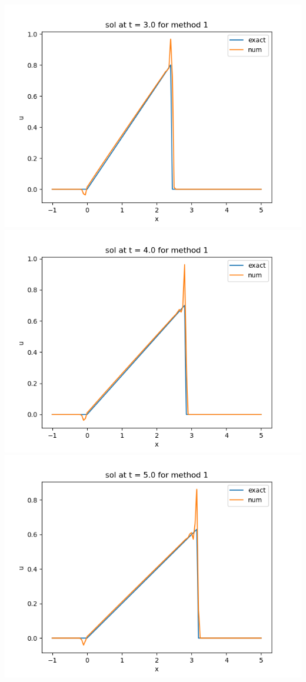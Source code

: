 \documentclass{article}
\begin{document}
\begin{enumerate}
\begin{center}
	\includegraphics[scale=.23]{hw13 sol t = 3 method 1}
	\includegraphics[scale=.3]{hw13 sol t = 4 method 1}
	\includegraphics[scale=.3]{hw13 sol t = 5 method 1}

\end{center}
\end{enumerate}
\end{document}
